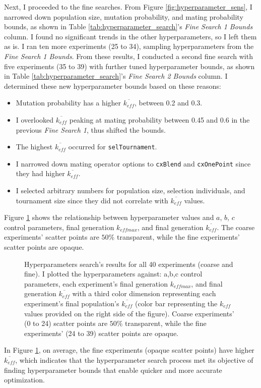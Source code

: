 Next, I proceeded to the fine searches. 
From Figure \ref{fig:hyperparameter_sens}, I narrowed down population size, 
mutation probability, and mating probability bounds, as shown in Table 
\ref{tab:hyperparameter_search}'s \textit{Fine Search 1 Bounds} column. 
I found no significant trends in the other hyperparameters, so I left them 
as is. 
I ran ten more experiments (25 to 34), sampling hyperparameters from 
the \textit{Fine Search 1 Bounds}. 
From these results, I conducted a second fine search with five experiments 
(35 to 39) with further tuned hyperparameter bounds, as shown in Table 
\ref{tab:hyperparameter_search}'s \textit{Fine Search 2 Bounds} column. 
I determined these new hyperparameter bounds based on these reasons: 
\begin{itemize}
    \item Mutation probability has a higher $\overline{k_{eff}}$, between 0.2 and 0.3.
    \item I overlooked $\overline{k_{eff}}$  peaking at mating probability between 
    0.45 and 0.6 in the previous \textit{Fine Search 1}, thus shifted the bounds. 
    \item The highest $\overline{k_{eff}}$ occurred for \texttt{selTournament}. 
    \item I narrowed down mating operator options to \texttt{cxBlend} and 
    \texttt{cxOnePoint} since they had higher $\overline{k_{eff}}$. 
    \item I selected arbitrary numbers for population size, 
    selection individuals, and tournament size since they did not 
    correlate with $\overline{k_{eff}}$ values. 
\end{itemize}
Figure \ref{fig:input_hyperparameters_sens} shows the relationship between 
hyperparameter values and $a$, $b$, $c$ control parameters, final generation 
$k_{eff max}$, and final generation $\overline{k_{eff}}$. 
The coarse experiments' scatter points are $50\%$ transparent, while the fine 
experiments' scatter points are opaque. 
\begin{figure}[htbp]
    \centering
    \caption{Hyperparameters search's results for all 40 experiments (coarse 
    and fine). I plotted the hyperparameters against: a,b,c control parameters, 
    each experiment's final generation $k_{eff max}$, and final generation 
    $\overline{k_{eff}}$ with a third color dimension representing each experiment's final 
    population's $\overline{k_{eff}}$ (color bar representing the $k_{eff}$ values 
    provided on the right side of the figure). Coarse experiments' (0 to 24) scatter points 
    are $50\%$ transparent, while the fine experiments' (24 to 39) scatter points 
    are opaque. }
    \label{fig:input_hyperparameters_sens}
\end{figure}
In Figure \ref{fig:input_hyperparameters_sens}, on average, the fine experiments 
(opaque scatter points) have higher $\overline{k_{eff}}$, which indicates that the
hyperparameter search process met its objective of finding hyperparameter 
bounds that enable quicker and more accurate optimization. 

